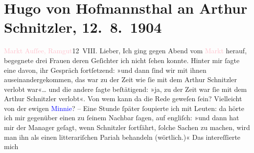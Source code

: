 

               \section[Hugo von Hofmannsthal an Arthur Schnitzler, 12. 8. 1904]{ Hugo von Hofmannsthal an Arthur Schnitzler, 12. 8. 1904}\nopagebreak{}\rehead{ }\normalsize\beginnumbering{} \toendnotes[C]{\smallbreak\pagebreak[2]} 
\toendnotes[C]{\smallbreak}\pstart
           \raggedleft{}{\pb}\textcolor{pink}{Markt Auſſee, Ramgut}{}\ledrightnote{\textcolor{pink}{Ramgut}}{\\}12 VIII.\pend
           \pstart{}Lieber,\pend\pstart
           Ich ging gegen Abend vom \textcolor{pink}{Markt}{}\ledrightnote{\textcolor{pink}{Bad Aussee}} herauf, begegnete
               drei Frauen deren Geſichter ich nicht ſehen konnte. Hinter mir ſagte eine davon, ihr
               Gespräch fortſetzend: »und dann ſind wir mit ihnen auseinandergekommen, das war zu
               der Zeit wie ſie mit dem Arthur Schnitzler verlobt war«{\dots}
               und die andere ſagte beſtätigend: »ja, zu der Zeit war ſie mit {\pb}dem Arthur Schnitzler verlobt«.
               Von wem kann da die Rede geweſen ſein? Vielleicht von der ewigen \textcolor{blue}{Minnie}{}\ledrightnote{\textcolor{blue}{Hermine von Schaffgotsch}}?\pend
           \pstart
           \numberlinefalse{}\centering{}–\numberlinetrue{}\pend
           \pstart
           \noindent{}Eine Stunde ſpäter ſoupierte ich mit Leuten: da hörte ich mir gegenüber einen  zu ſeinem Nachbar ſagen, auf engliſch: »und dann
               hat mir der Manager geſagt, wenn Schnitzler fortfährt, {\pb}ſolche Sachen zu machen, wird man
               ihn als einen litterariſchen Pariah behandeln (wörtlich.)« Das intereſſierte mich
